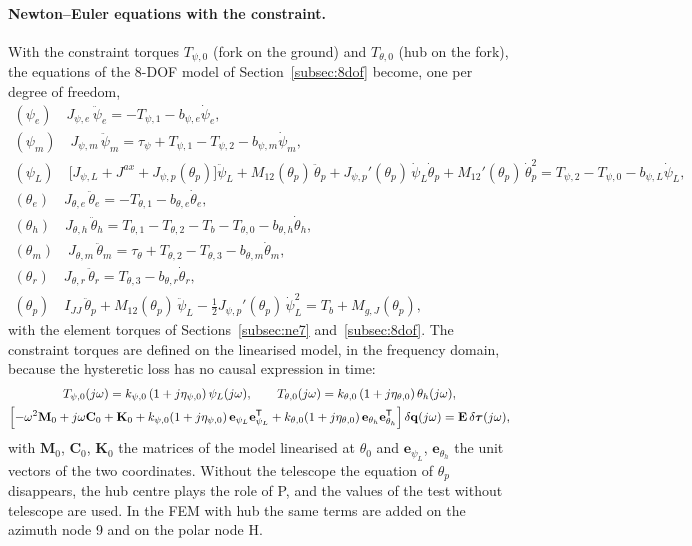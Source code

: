 \documentclass[10pt,a4paper]{article}
\numberwithin{equation}{section}
\begin{document}
\paragraph{Newton--Euler equations with the constraint.} With the constraint torques $T_{\psi,0}$ (fork on the ground) and $T_{\theta,0}$ (hub on the fork), the equations of the 8-DOF model of Section~\ref{subsec:8dof} become, one per degree of freedom,
\begin{gather}
(\psi_e)\quad J_{\psi,e}\,\ddot\psi_e = -T_{\psi,1} - b_{\psi,e}\dot\psi_e,\\
(\psi_m)\quad J_{\psi,m}\,\ddot\psi_m = \tau_\psi + T_{\psi,1} - T_{\psi,2} - b_{\psi,m}\dot\psi_m,\\
(\psi_L)\quad \bigl[J_{\psi,L} + J^{ax} + J_{\psi,p}(\theta_p)\bigr]\ddot\psi_L + M_{12}(\theta_p)\,\ddot\theta_p + J_{\psi,p}'(\theta_p)\,\dot\psi_L\dot\theta_p + M_{12}'(\theta_p)\,\dot\theta_p^2 = T_{\psi,2} - T_{\psi,0} - b_{\psi,L}\dot\psi_L,\\
(\theta_e)\quad J_{\theta,e}\,\ddot\theta_e = -T_{\theta,1} - b_{\theta,e}\dot\theta_e,\\
(\theta_h)\quad J_{\theta,h}\,\ddot\theta_h = T_{\theta,1} - T_{\theta,2} - T_b - T_{\theta,0} - b_{\theta,h}\dot\theta_h,\\
(\theta_m)\quad J_{\theta,m}\,\ddot\theta_m = \tau_\theta + T_{\theta,2} - T_{\theta,3} - b_{\theta,m}\dot\theta_m,\\
(\theta_r)\quad J_{\theta,r}\,\ddot\theta_r = T_{\theta,3} - b_{\theta,r}\dot\theta_r,\\
(\theta_p)\quad I_{JJ}\,\ddot\theta_p + M_{12}(\theta_p)\,\ddot\psi_L - \tfrac12 J_{\psi,p}'(\theta_p)\,\dot\psi_L^2 = T_b + M_{g,J}(\theta_p),
\end{gather}
with the element torques of Sections~\ref{subsec:ne7} and~\ref{subsec:8dof}. The constraint torques are defined on the linearised model, in the frequency domain, because the hysteretic loss has no causal expression in time:
\begin{gather}
T_{\psi,0}(j\omega) = k_{\psi,0}\,(1 + j\eta_{\psi,0})\,\psi_L(j\omega),\qquad T_{\theta,0}(j\omega) = k_{\theta,0}\,(1 + j\eta_{\theta,0})\,\theta_h(j\omega),\\
\Bigl[-\omega^2\mathbf M_0 + j\omega\mathbf C_0 + \mathbf K_0 + k_{\psi,0}(1 + j\eta_{\psi,0})\,\mathbf e_{\psi_L}\mathbf e_{\psi_L}^{\mathsf T} + k_{\theta,0}(1 + j\eta_{\theta,0})\,\mathbf e_{\theta_h}\mathbf e_{\theta_h}^{\mathsf T}\Bigr]\,\delta\mathbf q(j\omega) = \mathbf E\,\delta\boldsymbol\tau(j\omega),\label{eq:ground_lin}
\end{gather}
with $\mathbf M_0$, $\mathbf C_0$, $\mathbf K_0$ the matrices of the model linearised at $\theta_0$ and $\mathbf e_{\psi_L}$, $\mathbf e_{\theta_h}$ the unit vectors of the two coordinates. Without the telescope the equation of $\theta_p$ disappears, the hub centre plays the role of P, and the values of the test without telescope are used. In the FEM with hub the same terms are added on the azimuth node 9 and on the polar node H.
\end{document}
